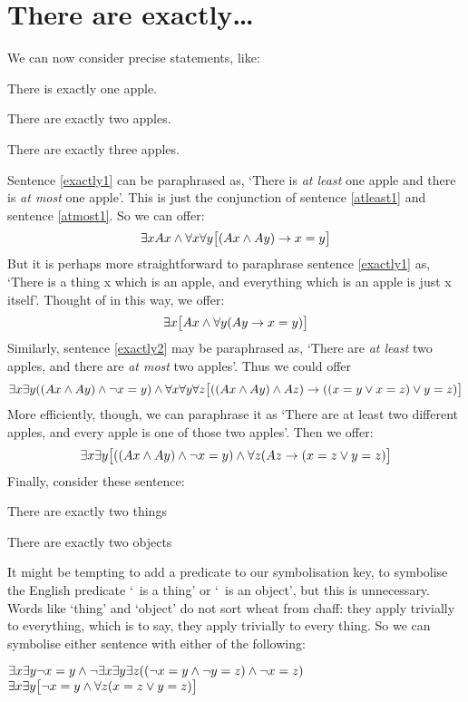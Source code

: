 \section{There are exactly\ldots}
We can now consider precise statements, like:
\begin{earg}
\item[\ex{exactly1}] There is exactly one apple.
\item[\ex{exactly2}] There are exactly two apples.
\item[\ex{exactly3}] There are exactly three apples.
\end{earg}
Sentence \ref{exactly1} can be paraphrased as, `There is \emph{at least} one apple and there is \emph{at most} one apple'. This is just the conjunction of sentence \ref{atleast1} and sentence \ref{atmost1}. So we can offer:
$$\exists x Ax \wedge \forall x\forall y\bigl[(Ax \wedge Ay) \rightarrow x=y\bigr]$$
But it is perhaps more straightforward to paraphrase sentence \ref{exactly1} as, `There is a thing x which is an apple, and everything which is an apple is just x itself'. Thought of in this way, we offer: 
$$\exists x\bigl[Ax \wedge \forall y(Ay \rightarrow x= y)\bigr]$$
Similarly, sentence \ref{exactly2} may be paraphrased as, `There are \emph{at least} two apples, and there are \emph{at most} two apples'. Thus we could offer 
$$\exists x \exists y((Ax \wedge Ay) \wedge \neg x = y) \wedge \forall x\forall y\forall z\bigl[((Ax \wedge Ay) \wedge Az) \rightarrow ((x=y \vee x=z) \vee y=z)\bigr]$$
More efficiently, though, we can paraphrase it as `There are at least two different apples, and every apple is one of those two apples'. Then we offer:
$$\exists x\exists y\bigl[((Ax \wedge Ay) \wedge \neg x = y) \wedge \forall z(Az \rightarrow ( x= z \vee y = z)\bigr]$$
Finally, consider these sentence:
\begin{earg}
\item[\ex{exactly2things}] There are exactly two things
\item[\ex{exactly2objects}] There are exactly two objects
\end{earg}
It might be tempting to add a predicate to our symbolisation key, to symbolise the English predicate `\blank\ is a thing' or `\blank\ is an object', but this is unnecessary. Words like `thing' and `object' do not sort wheat from chaff: they apply trivially to everything, which is to say, they apply trivially to every thing. So we can symbolise either sentence with either of the following:
	\begin{center}
		$\exists x \exists y \neg x = y \wedge \neg \exists x \exists y \exists z ((\neg x = y \wedge \neg y = z) \wedge \neg x = z)$\\
		
		$\exists x \exists y \bigl[\neg x = y \wedge \forall z(x=z \vee y = z)\bigr]$
	\end{center}

